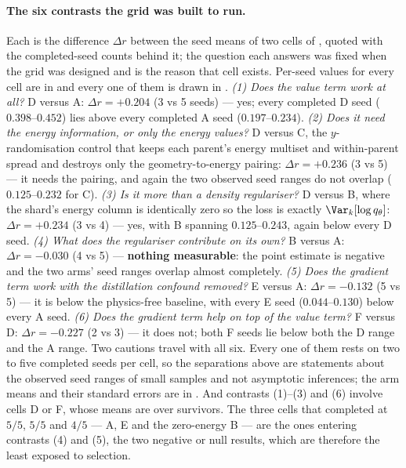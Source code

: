\paragraph{The six contrasts the grid was built to run.} Each is the difference
$\Delta r$ between the seed means of two cells of , quoted with the
completed-seed counts behind it; the question each answers was fixed when the grid was
designed and is the reason that cell exists. Per-seed values for every cell are in
 and every one of them is drawn in .
\emph{(1) Does the value term work at all?} D versus A: $\Delta r = +0.204$
(3 vs 5 seeds) --- yes; every completed D seed ($0.398$--$0.452$) lies above every
completed A seed ($0.197$--$0.234$).
\emph{(2) Does it need the energy \emph{information}, or only the energy \emph{values}?}
D versus C, the $y$-randomisation control that keeps each parent's energy multiset and
within-parent spread and destroys only the geometry-to-energy pairing:
$\Delta r = +0.236$ (3 vs 5) --- it needs the pairing, and again the two observed seed
ranges do not overlap ($0.125$--$0.232$ for C).
\emph{(3) Is it more than a density regulariser?} D versus B, where the shard's energy
column is identically zero so the loss is exactly $\Var_k[\log q_\theta]$:
$\Delta r = +0.234$ (3 vs 4) --- yes, with B spanning $0.125$--$0.243$, again below
every D seed.
\emph{(4) What does the regulariser contribute on its own?} B versus A:
$\Delta r = -0.030$ (4 vs 5) --- \textbf{nothing measurable}: the point estimate is
negative and the two arms' seed ranges overlap almost completely.
\emph{(5) Does the gradient term work with the distillation confound removed?} E versus
A: $\Delta r = -0.132$ (5 vs 5) --- it is below the physics-free baseline, with every
E seed ($0.044$--$0.130$) below every A seed.
\emph{(6) Does the gradient term help on top of the value term?} F versus D:
$\Delta r = -0.227$ (2 vs 3) --- it does not; both F seeds lie below both the D range
and the A range.
Two cautions travel with all six. Every one of them rests on two to five completed
seeds per cell, so the separations above are statements about the observed seed
ranges of small samples and not asymptotic inferences; the arm means and their
standard errors are in . And contrasts (1)--(3) and (6) involve
cells D or F, whose means are over survivors. The three cells that completed at $5/5$,
$5/5$ and $4/5$ --- A, E and the zero-energy B --- are the ones entering contrasts (4)
and (5), the two negative or null results, which are therefore the least exposed to
selection.

